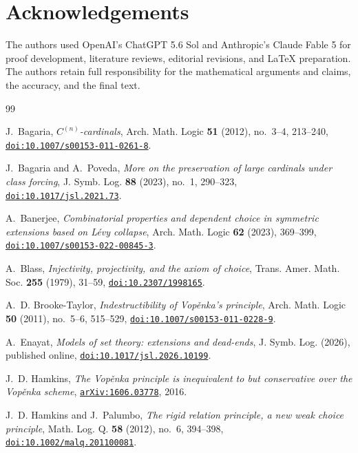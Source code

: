 \documentclass[11pt,a4paper]{amsart}
\theoremstyle{plain}
\theoremstyle{definition}
\theoremstyle{remark}
\begin{document}
\section*{Acknowledgements}

{The authors used OpenAI's ChatGPT 5.6 Sol and Anthropic's Claude Fable 5 for proof development, literature reviews, editorial revisions, and LaTeX preparation.  The authors retain full responsibility for the mathematical arguments and claims, the accuracy, and the final text.}

\begin{thebibliography}{99}

J.~Bagaria,
\emph{$C^{(n)}$-cardinals},
Arch. Math. Logic \textbf{51} (2012), no.~3--4, 213--240,
\href{https://doi.org/10.1007/s00153-011-0261-8}{\nolinkurl{doi:10.1007/s00153-011-0261-8}}.

J.~Bagaria and A.~Poveda,
\emph{More on the preservation of large cardinals under class forcing},
J. Symb. Log. \textbf{88} (2023), no.~1, 290--323,
\href{https://doi.org/10.1017/jsl.2021.73}{\nolinkurl{doi:10.1017/jsl.2021.73}}.

A.~Banerjee,
\emph{Combinatorial properties and dependent choice in symmetric extensions based on L\'evy collapse},
Arch. Math. Logic \textbf{62} (2023), 369--399,
\href{https://doi.org/10.1007/s00153-022-00845-3}{\nolinkurl{doi:10.1007/s00153-022-00845-3}}.

A.~Blass,
\emph{Injectivity, projectivity, and the axiom of choice},
Trans. Amer. Math. Soc. \textbf{255} (1979), 31--59,
\href{https://doi.org/10.2307/1998165}{\nolinkurl{doi:10.2307/1998165}}.

A.~D. Brooke-Taylor,
\emph{Indestructibility of Vop\v{e}nka's principle},
Arch. Math. Logic \textbf{50} (2011), no.~5--6, 515--529{,
\href{https://doi.org/10.1007/s00153-011-0228-9}{\nolinkurl{doi:10.1007/s00153-011-0228-9}}}.

A.~Enayat,
\emph{Models of set theory: extensions and dead-ends},
{J. Symb. Log. (2026), published online,
\href{https://doi.org/10.1017/jsl.2026.10199}{\nolinkurl{doi:10.1017/jsl.2026.10199}}.}

J.~D. Hamkins,
\emph{The Vop\v{e}nka principle is inequivalent to but conservative over the Vop\v{e}nka scheme},
\href{https://arxiv.org/abs/1606.03778}{\nolinkurl{arXiv:1606.03778}}, 2016.

J.~D. Hamkins and J.~Palumbo,
\emph{The rigid relation principle, a new weak choice principle},
Math. Log. Q. \textbf{58} (2012), no.~6, 394--398,
\href{https://doi.org/10.1002/malq.201100081}{\nolinkurl{doi:10.1002/malq.201100081}}.


\end{thebibliography}
\end{document}

